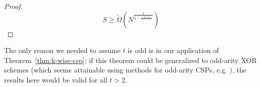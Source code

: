\documentclass[11pt]{article}
\newtheorem{theorem}{Theorem}
\newcommand{\todo}[1]{\textcolor{red}{TODO: #1}}
\begin{document}
\begin{proof}
\[
S \geq \tilde{\Omega}(N^{\frac{1}{\frac{t}{2} -\frac{t- 2}{2(t+2)}}})
\]
\end{proof}

The only reason we needed to assume $t$ is odd is in our application of Theorem~\ref{thm:k-wise-csp}; if this theorem could be generalized to odd-arity XOR schemes (which seems attainable using methods for odd-arity CSPs, e.g. \cite{smoothed}), the results here would be valid for all $t > 2$.

\end{document}
